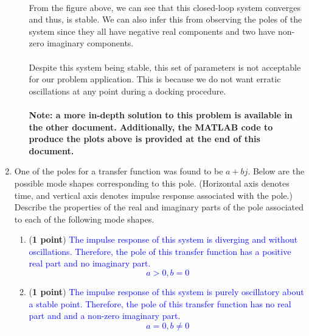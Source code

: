 \documentclass[]{article}
\begin{document}
\begin{enumerate}
\begin{enumerate}
{\begin{figure}[h]
        \end{figure}\\
        From the figure above, we can see that this closed-loop system converges and thus, is stable. We can also infer this from observing the poles of the system since they all have negative real components and two have non-zero imaginary components.\\\\
        Despite this system being stable, this set of parameters is not acceptable for our problem application. This is because we do not want erratic oscillations at any point during a docking procedure.\\\\
        \textbf{Note: a more in-depth solution to this problem is available in the other document. Additionally, the MATLAB code to produce the plots above is provided at the end of this document.}
        \vspace{0.3cm}
        }
    \end{enumerate}

    \item One of the poles for a transfer function was found to be $a+bj$. Below are the possible mode shapes corresponding to this pole. (Horizontal axis denotes time, and vertical axis denotes impulse response associated with the pole.) Describe the properties of the real and imaginary parts of the pole associated to each of the following mode shapes.
    
    \begin{enumerate}
        \item (\textbf{1 point}) %
        \textcolor{blue}{
        The impulse response of this system is diverging and without oscillations. Therefore, the pole of this transfer function has a positive real part and no imaginary part.\\
        $$a > 0,b = 0$$
        }

        \item (\textbf{1 point}) %
        \textcolor{blue}{
        The impulse response of this system is purely oscillatory about a stable point. Therefore, the pole of this transfer function has no real part and and a non-zero imaginary part.\\
        $$a = 0,b \neq 0$$
        }


\end{enumerate}
\end{enumerate}
\end{document}
